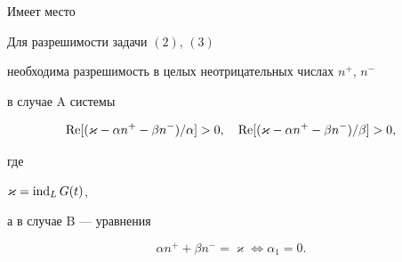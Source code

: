 Имеет место





\begin{thm} Для разрешимости задачи $(2)$, $(3)$


необходима разрешимость в целых неотрицательных числах $n^+$, $n^-$


в случае $\mathrm A$ системы


\begin{equation}


\re [(\varkappa-\alpha n^{+}-\beta n^{-})/\alpha] > 0,\quad


\re [(\varkappa-\alpha n^{+}-\beta n^{-})/\beta] > 0,


\end{equation}


где


$\varkappa = \operatorname{ind}_{L}G(t)$,


а в случае $\mathrm B$ --- уравнения


\begin{equation}


\alpha n^{+} +\beta n^{-} = \varkappa


\Longleftrightarrow \alpha_1=0.


\end{equation}


\end{thm}





